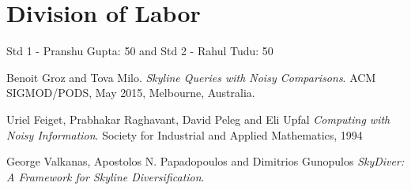 \documentclass[twocolumn]{article}
\begin{document}
\section{Division of Labor}
Std 1 - Pranshu Gupta: 50 and Std 2 - Rahul Tudu: 50

\begin{thebibliography}{3}

Benoit Groz and Tova Milo. 
\textit{Skyline Queries with Noisy Comparisons}. 
ACM SIGMOD/PODS, May 2015, Melbourne, Australia.
 
Uriel Feiget, Prabhakar Raghavant, David Peleg and Eli Upfal
\textit{Computing with Noisy Information}. 
Society for Industrial and Applied Mathematics, 1994

George Valkanas, Apostolos N. Papadopoulos and Dimitrios Gunopulos
\textit{SkyDiver: A Framework for Skyline Diversification}. 


\end{thebibliography}
\end{document}
